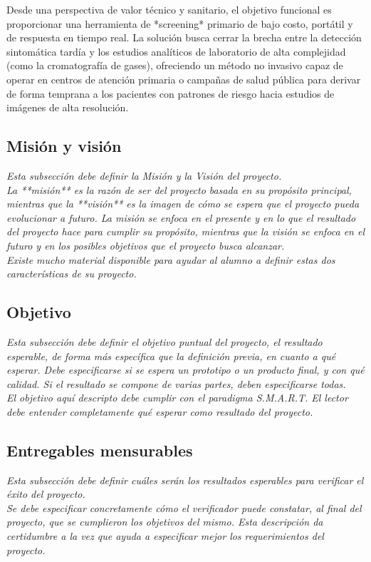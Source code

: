 \documentclass[12pt]{article}
\begin{document}
Desde una perspectiva de valor técnico y sanitario, el objetivo funcional es proporcionar una herramienta de *screening* primario de bajo costo, portátil y de respuesta en tiempo real. La solución busca cerrar la brecha entre la detección sintomática tardía y los estudios analíticos de laboratorio de alta complejidad (como la cromatografía de gases), ofreciendo un método no invasivo capaz de operar en centros de atención primaria o campañas de salud pública para derivar de forma temprana a los pacientes con patrones de riesgo hacia estudios de imágenes de alta resolución.
\subsection{Misión y visión}
{\it
Esta subsección debe definir la Misión y la Visión del proyecto.\\
La **misión** es la razón de ser del proyecto basada en su propósito principal, mientras que la **visión** es la imagen de cómo se espera que el proyecto pueda evolucionar a futuro. La misión se enfoca en el presente y en lo que el resultado del proyecto hace para cumplir su propósito, mientras que la visión se enfoca en el futuro y en los posibles objetivos que el proyecto busca alcanzar.\\
Existe mucho material disponible para ayudar al alumno a definir estas dos características de su proyecto.
}

\subsection{Objetivo}
{\it
Esta subsección debe definir el objetivo puntual del proyecto, el resultado esperable, de forma más específica que la definición previa, en cuanto a qué esperar. Debe especificarse si se espera un prototipo o un producto final, y con qué calidad. Si el resultado se compone de varias partes, deben especificarse todas.\\
El objetivo aquí descripto debe cumplir con el paradigma S.M.A.R.T. El lector debe entender completamente qué esperar como resultado del proyecto.
}

\subsection{Entregables mensurables}
{\it
Esta subsección debe definir cuáles serán los resultados esperables para verificar el éxito del proyecto.\\
Se debe especificar concretamente cómo el verificador puede constatar, al final del proyecto, que se cumplieron los objetivos del mismo. Esta descripción da certidumbre a la vez que ayuda a especificar mejor los requerimientos del proyecto.
}
\end{document}
